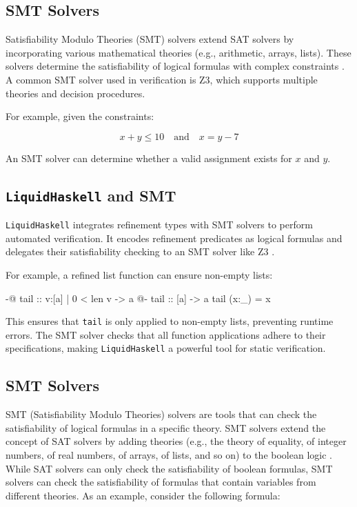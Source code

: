 \documentclass[]{rptuseminar}
\begin{document}
\subsection{SMT Solvers}
Satisfiability Modulo Theories (SMT) solvers extend SAT solvers by incorporating various 
mathematical theories (e.g., arithmetic, arrays, lists). These solvers determine the 
satisfiability of logical formulas with complex constraints \cite{clarke_satisfiability_2018}. 
A common SMT solver used in verification is Z3, which supports multiple theories and decision procedures.

For example, given the constraints:

\begin{equation}
x + y \leq 10 \quad \text{and} \quad x = y - 7
\end{equation}

An SMT solver can determine whether a valid assignment exists for \(x\) and \(y\).

\subsection{\texttt{LiquidHaskell} and SMT}
\texttt{LiquidHaskell} integrates refinement types with SMT solvers to perform automated verification. 
It encodes refinement predicates as logical formulas and delegates their satisfiability checking to an SMT solver like Z3 
\cite{vazou_refinement_2014}. 

For example, a refined list function can ensure non-empty lists:

\begin{haskell}
{-@ tail :: {v:[a] | 0 < len v} -> a @-}
tail :: [a] -> a
tail (x:_) = x
\end{haskell}

This ensures that \texttt{tail} is only applied to non-empty lists, preventing runtime errors. 
The SMT solver checks that all function applications adhere to their specifications, 
making \texttt{LiquidHaskell} a powerful tool for static verification.

\subsection{SMT Solvers}
SMT (Satisfiability Modulo Theories) solvers are tools that can check the satisfiability of logical formulas in a specific theory.
SMT solvers extend the concept of SAT solvers by adding theories (e.g., the theory of equality, 
of integer numbers, of real numbers, of arrays, of lists, and so on) to the boolean logic \cite{clarke_satisfiability_2018}.
While SAT solvers can only check the satisfiability of boolean formulas, SMT solvers can check the satisfiability of formulas 
that contain variables from different theories. 
As an example, consider the following formula:
\end{document}

